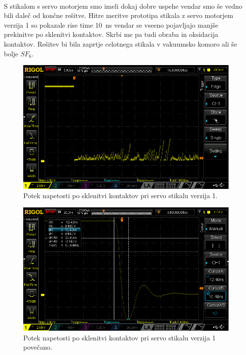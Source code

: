\documentclass[a4paper,twoside,openright,12pt,Slovene]{book}
\begin{document}
    ~\\S stikalom s servo motorjem smo imeli dokaj dobre uspehe vendar smo še vedno bili daleč od končne rešitve. Hitre meritve prototipa stikala z servo motorjem verzija 1 so pokazale rise time  \SI{10}{\nano\second} vendar se vseeno pojavljajo manjše prekinitve po sklenitvi kontaktov. Skrbi me pa tudi obraba in oksidacija kontaktov. Rešitev bi bila zaprtje celotnega stikala v vakuumsko komoro ali še bolje $SF_{6}$.
    
    \begin{figure}[H]
        \centering
        \includegraphics[width=1\columnwidth]{Slike/ServoStikalo1/ServoStikalo1.png}
        \caption{\label{ServoStikalo1} Potek napetosti po sklenitvi kontaktov pri servo stikalu verzija 1.}
    \end{figure}
    
    \begin{figure}[H]
        \centering
        \includegraphics[width=1\columnwidth]{Slike/ServoStikalo1/ServoStikalo1povecano.png}
        \caption{\label{ServoStikalo1povecano} Potek napetosti po sklenitvi kontaktov pri servo stikalu verzija 1 povečano.}
    \end{figure}
    
\end{document}
